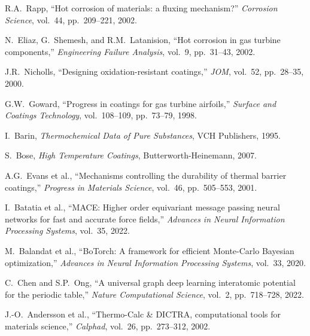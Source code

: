 \documentclass[11pt,letterpaper]{article}
\begin{document}
\begin{enumerate}[nosep,label={[\arabic*]}]

\item R.A.\ Rapp, ``Hot corrosion of materials: a fluxing mechanism?'' \textit{Corrosion Science}, vol.\ 44, pp.\ 209--221, 2002.

\item N.\ Eliaz, G.\ Shemesh, and R.M.\ Latanision, ``Hot corrosion in gas turbine components,'' \textit{Engineering Failure Analysis}, vol.\ 9, pp.\ 31--43, 2002.

\item J.R.\ Nicholls, ``Designing oxidation-resistant coatings,'' \textit{JOM}, vol.\ 52, pp.\ 28--35, 2000.

\item G.W.\ Goward, ``Progress in coatings for gas turbine airfoils,'' \textit{Surface and Coatings Technology}, vol.\ 108--109, pp.\ 73--79, 1998.

\item I.\ Barin, \textit{Thermochemical Data of Pure Substances}, VCH Publishers, 1995.

\item S.\ Bose, \textit{High Temperature Coatings}, Butterworth-Heinemann, 2007.

\item A.G.\ Evans et al., ``Mechanisms controlling the durability of thermal barrier coatings,'' \textit{Progress in Materials Science}, vol.\ 46, pp.\ 505--553, 2001.

\item I.\ Batatia et al., ``MACE: Higher order equivariant message passing neural networks for fast and accurate force fields,'' \textit{Advances in Neural Information Processing Systems}, vol.\ 35, 2022.

\item M.\ Balandat et al., ``BoTorch: A framework for efficient Monte-Carlo Bayesian optimization,'' \textit{Advances in Neural Information Processing Systems}, vol.\ 33, 2020.

\item C.\ Chen and S.P.\ Ong, ``A universal graph deep learning interatomic potential for the periodic table,'' \textit{Nature Computational Science}, vol.\ 2, pp.\ 718--728, 2022.

\item J.-O.\ Andersson et al., ``Thermo-Calc \& DICTRA, computational tools for materials science,'' \textit{Calphad}, vol.\ 26, pp.\ 273--312, 2002.


\end{enumerate}
\end{document}
